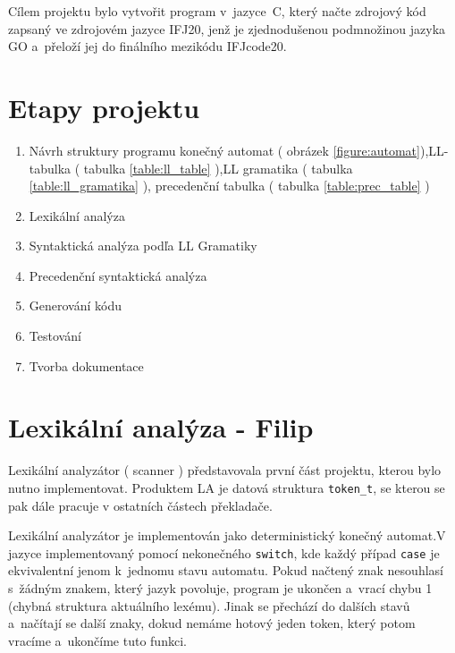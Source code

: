 \documentclass[a4paper, 11pt]{article}
\begin{document}
	Cílem projektu bylo vytvořit program v~jazyce~C, který načte zdrojový kód zapsaný ve zdrojovém jazyce IFJ20,
	jenž je zjednodušenou podmnožinou jazyka GO a~přeloží jej do finálního mezikódu IFJcode20.
 
  \section{Etapy projektu}
    \begin{enumerate}
  \item Návrh struktury programu konečný automat ( obrázek \ref{figure:automat}),LL-tabulka ( tabulka \ref{table:ll_table} ),\newline LL gramatika ( tabulka \ref{table:ll_gramatika} ), precedenční tabulka ( tabulka \ref{table:prec_table} )
  \vspace{-0.6em}
  \item Lexikální analýza
  \vspace{-0.6em}
  \item Syntaktická analýza podľa LL Gramatiky
  \vspace{-0.6em}
  \item Precedenční syntaktická analýza 
  \vspace{-0.6em}
  \item Generování kódu
  \vspace{-0.6em}
  \item Testování
  \vspace{-0.6em}
  \item Tvorba dokumentace
  \vspace{-0.6em}
    \end{enumerate}


	\section{Lexikální analýza - Filip}
    Lexikální analyzátor ( scanner ) představovala první část projektu, kterou bylo nutno implementovat. 
    Produktem LA je datová struktura \verb|token_t|, se kterou se pak dále pracuje v ostatních částech překladače.
	
	Lexikální analyzátor je implementován jako deterministický konečný automat.V jazyce implementovaný pomocí nekonečného \texttt{switch}, kde každý případ
	\texttt{case} je ekvivalentní jenom k~jednomu stavu automatu. Pokud načtený znak nesouhlasí s~žádným znakem, který jazyk povoluje,
	program je ukončen a~vrací chybu 1  (chybná struktura aktuálního lexému). Jinak se přechází do dalších stavů a~načítají se další znaky, dokud nemáme hotový jeden
	token, který potom vracíme a~ukončíme tuto funkci.
	
\end{document}
